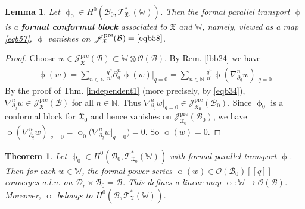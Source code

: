 \documentclass[11pt,b5paper,notitlepage]{article}
\theoremstyle{definition}
\theoremstyle{plain}
\newtheorem{thm}[df]{Theorem}
\newtheorem{lm}[df]{Lemma}
\newcommand{\mc}{\mathcal}
\newcommand{\scr}{\mathscr}
\newcommand{\Wbb}{\mathbb W}
\newcommand{\Nbb}{\mathbb N}
\newcommand{\<}{\left\langle}
\renewcommand{\>}{\right\rangle}
\newcommand{\MB}{\mathcal{B}}
\newcommand{\fx}{\mathfrak{X}}
\newcommand{\SJ}{\mathscr{J}}
\newcommand{\pre}{\mathrm{pre}}
\numberwithin{equation}{subsection}
\begin{document}
\begin{lm}\label{lbb25}
Let $\upphi_0\in H^0(\MB_0,\scr T_{\fx_0}^*(\Wbb))$. Then the formal parallel transport    $\upphi$ is a \textbf{formal conformal block}  associated to $\fx$ and $\Wbb$, namely, viewed as a map \eqref{eqb57}, $\upphi$ vanishes on $\SJ_\fx^\pre(\MB)=\eqref{eqb58}$.
\end{lm}


\begin{proof}
Choose $w\in \SJ_\fx^\pre(\MB)\subset \Wbb\otimes\mc O(\MB)$. By Rem. \ref{lbb24} we have
    \begin{align*}
        \upphi(w)=\sum_{n\in \Nbb}\frac{q^n}{n!}\partial_q^n \upphi(w)\big|_{q=0}=\sum_{n\in \Nbb}\frac{q^n}{n!}\upphi(\nabla_{\partial_q}^n w)\big|_{q=0} 
    \end{align*}
By the proof of Thm. \ref{independent1} (more precisely, by \eqref{eqb34}), $\nabla_{\partial_q}^n w\in \SJ_\fx^\pre(\MB)$ for all $n\in \Nbb$. Thus $\nabla^n_{\partial_q}w\big|_{q=0}\in\SJ_{\fx_0}^\pre(\MB_0)$. Since $\upphi_0$ is a conformal block for $\fx_0$ and hence vanishes on $\SJ_{\fx_0}^\pre(\MB_0)$, we have $\upphi(\nabla_{\partial_q}^n w)\big|_{q=0}=\upphi_0\big(\nabla_{\partial_q}^n w\big|_{q=0}\big)=0$. So $\upphi(w)=0$.
\end{proof}



\begin{thm}\label{lbb26}
Let $\upphi_0\in H^0(\MB_0,\scr T_{\fx_0}^*(\Wbb))$ with formal parallel transport $\upphi$. Then for each $w\in\Wbb$, the formal power series $\upphi(w)\in\mc O(\MB_0)[[q]]$ converges a.l.u. on $\mc D_r\times\MB_0=\MB$. This defines a linear map $\upphi:\Wbb\rightarrow\mc O(\MB)$. Moreover, $\upphi$ belongs to $H^0(\MB,\scr T_\fx^*(\Wbb))$.
\end{thm}
\end{document}
